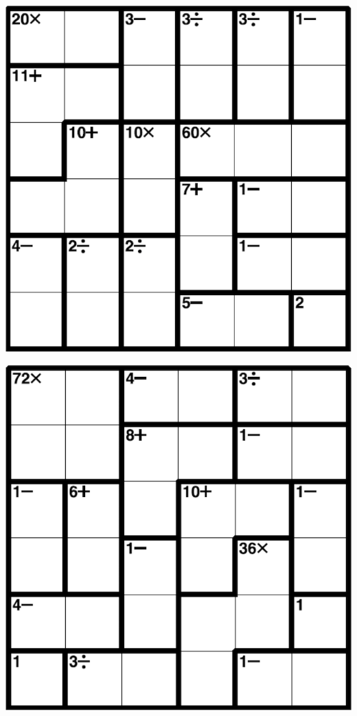 
\includegraphics[scale=1]{Gambar/Lampiran/6x6_25.png}

\includegraphics[scale=1]{Gambar/Lampiran/6x6_26.png}
